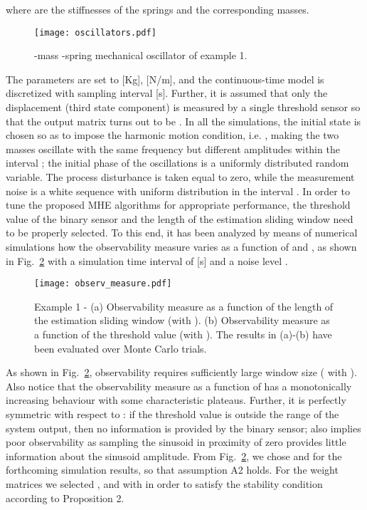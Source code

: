 \documentclass[11pt,journal,onecolumn]{IEEEtran}
\begin{document}
where  are the stiffnesses of the springs and  the corresponding masses.
\begin{figure}[h!]
\centering
\texttt{[image: oscillators.pdf]}\caption{-mass -spring mechanical oscillator of example 1.}
\label{fig:oscillators}
\end{figure}
The parameters are set to  [Kg],  [N/m], and the  continuous-time model is discretized with sampling interval  [s]. Further, it is assumed that only the displacement  (third state component) is measured by a single threshold sensor so that the output matrix turns out to be . In all the simulations, the initial state is chosen so as to impose the harmonic motion condition, i.e. , making the two masses oscillate with the same frequency but different amplitudes within the interval ; the initial phase of the oscillations is a uniformly distributed random variable. The process disturbance is taken equal to zero, while the measurement noise is a white sequence with uniform distribution in the interval . In order to tune the proposed MHE algorithms for appropriate performance, the threshold value  of the binary sensor and the length  of the estimation sliding window need to be properly selected. To this end, it has been analyzed by means of numerical simulations how the observability measure  varies as a function of  and , as shown in Fig.~\ref{fig:observability_measure} with a simulation time interval of  [s] and a noise level .
\begin{figure}[h!]
\centering
\texttt{[image: observ\_measure.pdf]}\caption{Example 1 - (a) Observability measure  as a function of the length  of the estimation sliding window (with ). (b) Observability measure  as a function of the threshold value   (with ). The results in (a)-(b) have been evaluated over  Monte Carlo trials.}
\label{fig:observability_measure}
\end{figure}
As shown in Fig.~\ref{fig:observability_measure}, observability requires  sufficiently large window size (  with ).
Also notice that the observability measure as a function of  has a monotonically increasing behaviour with some characteristic plateaus. Further, it is perfectly symmetric with respect to : if the threshold value is outside the range  of the system output, then no information is provided by the binary sensor;  also implies poor observability as sampling the sinusoid in proximity of zero provides little information about the sinusoid amplitude. From Fig.~\ref{fig:observability_measure}, we chose  and  for the forthcoming simulation results, so that assumption A2 holds. For the weight matrices we selected ,  and  with  in order to satisfy the stability condition  according to Proposition 2.
\end{document}
